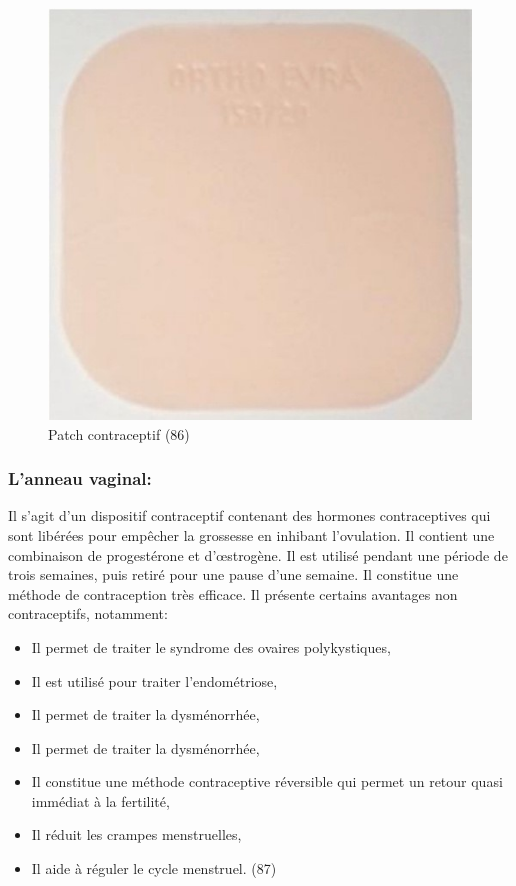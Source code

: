 \begin{figure}[H]
  \centering
  \includegraphics{Images/fig_41.jpg}
  \caption{Patch contraceptif (86)} 
\end{figure}

\subsubsection{L’anneau vaginal: }
Il s’agit d’un dispositif contraceptif contenant des hormones contraceptives qui sont libérées pour empêcher la grossesse en inhibant l’ovulation. Il contient une combinaison de progestérone et d’œstrogène. Il est utilisé pendant une période de trois semaines, puis retiré pour une pause d’une semaine. Il constitue une méthode de contraception très efficace. Il présente certains avantages non contraceptifs, notamment: 

\begin{itemize}
  \item	Il permet de traiter le syndrome des ovaires polykystiques, 
  \item Il est utilisé pour traiter l’endométriose, 
  \item	Il permet de traiter la dysménorrhée, 
  \item	Il permet de traiter la dysménorrhée, 
  \item	Il constitue une méthode contraceptive réversible qui permet un retour quasi immédiat à la fertilité, 
  \item	Il réduit les crampes menstruelles, 
  \item	Il aide à réguler le cycle menstruel. (87) 
\end{itemize}


